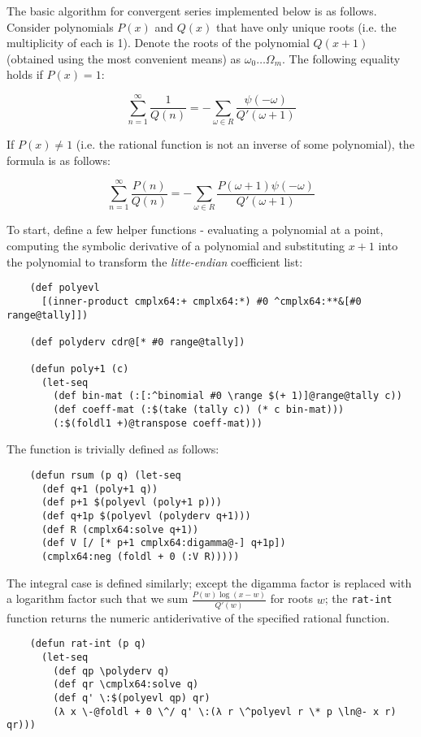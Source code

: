 The basic algorithm for convergent series implemented below is as follows. Consider polynomials $P(x)$ and $Q(x)$ that have only unique roots (i.e. the multiplicity of each is 1). Denote the roots of the polynomial $Q(x+1)$ (obtained using the most convenient means) as $\omega_0 \dots \Omega_m$. The following equality holds if $P(x)=1$:

$$
\sum_{n=1}^\infty \frac{1}{Q(n)} = -\sum_{\omega \in R} \frac{\psi(-\omega)}{Q'(\omega + 1)}
$$

If $P(x) \ne 1$ (i.e. the rational function is not an inverse of some polynomial), the formula is as follows:

$$
\sum_{n=1}^\infty \frac{P(n)}{Q(n)} = -\sum_{\omega \in R} \frac{P(\omega + 1) \psi(-\omega)}{Q'(\omega + 1)}
$$

To start, define a few helper functions - evaluating a polynomial at a point, computing the symbolic derivative of a polynomial and substituting $x+1$ into the polynomial to transform the \textit{litte-endian} coefficient list:

\begin{Verbatim}
    (def polyevl
      [(inner-product cmplx64:+ cmplx64:*) #0 ^cmplx64:**&[#0 range@tally]])

    (def polyderv cdr@[* #0 range@tally])

    (defun poly+1 (c)
      (let-seq
        (def bin-mat (:[:^binomial #0 \range $(+ 1)]@range@tally c))
        (def coeff-mat (:$(take (tally c)) (* c bin-mat)))
        (:$(foldl1 +)@transpose coeff-mat)))
\end{Verbatim}

The function is trivially defined as follows:

\begin{Verbatim}
    (defun rsum (p q) (let-seq
      (def q+1 (poly+1 q))
      (def p+1 $(polyevl (poly+1 p)))
      (def q+1p $(polyevl (polyderv q+1)))
      (def R (cmplx64:solve q+1))
      (def V [/ [* p+1 cmplx64:digamma@-] q+1p])
      (cmplx64:neg (foldl + 0 (:V R)))))
\end{Verbatim}

The integral case is defined similarly; except the digamma factor is replaced with a logarithm factor such that we sum $\displaystyle \frac{P(w) \log(x-w)}{Q'(w)}$ for roots $w$; the \verb|rat-int| function returns the numeric antiderivative of the specified rational function. 

\begin{Verbatim}
    (defun rat-int (p q)
      (let-seq
        (def qp \polyderv q)
        (def qr \cmplx64:solve q)
        (def q' \:$(polyevl qp) qr)
        (λ x \-@foldl + 0 \^/ q' \:(λ r \^polyevl r \* p \ln@- x r) qr)))
\end{Verbatim}

